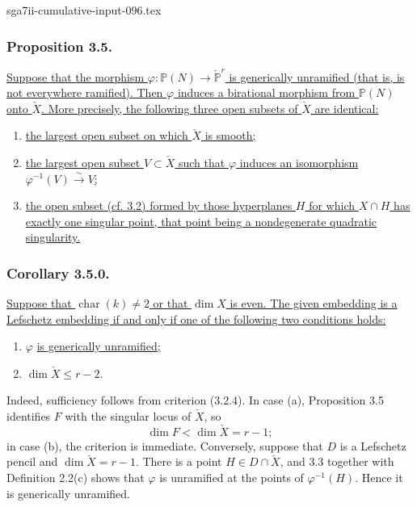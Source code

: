 \begin{filecontents*}{sga7ii-cumulative-input-096.tex}
\subsubsection*{Proposition 3.5.}
\underline{Suppose that the morphism
$\varphi:\mathbb P(N)\to\check{\mathbb P}^{r}$ is generically
unramified (that is, is not everywhere ramified).  Then $\varphi$
induces a birational morphism from $\mathbb P(N)$ onto $\check X$.
More precisely, the following three open subsets of $\check X$ are
identical:}
\begin{enumerate}
\item[(a)] \underline{the largest open subset on which $\check X$ is
smooth;}
\item[(b)] \underline{the largest open subset $V\subset\check X$ such
that $\varphi$ induces an isomorphism
$\varphi^{-1}(V)\xrightarrow{\sim}V$;}
\item[(c)] \underline{the open subset (cf. 3.2) formed by those
hyperplanes $H$ for which $X\cap H$ has exactly one singular point,
that point being a nondegenerate quadratic singularity.}
\end{enumerate}

\subsubsection*{Corollary 3.5.0.}
\underline{Suppose that $\operatorname{char}(k)\ne2$ or that $\dim X$
is even.  The given embedding is a Lefschetz embedding if and only if
one of the following two conditions holds:}
\begin{enumerate}
\item[(a)] $\varphi$ \underline{is generically unramified;}
\item[(b)] $\dim\check X\leq r-2$.
\end{enumerate}

Indeed, sufficiency follows from criterion (3.2.4).  In case (a),
Proposition 3.5 identifies $F$ with the singular locus of $\check X$,
so
\[
\dim F<\dim\check X=r-1;
\]
in case (b), the criterion is immediate.  Conversely, suppose that
$D$ is a Lefschetz pencil and $\dim\check X=r-1$.  There is a point
$H\in D\cap\check X$, and 3.3 together with Definition 2.2(c) shows
that $\varphi$ is unramified at the points of $\varphi^{-1}(H)$.
Hence it is generically unramified.


\end{filecontents*}
